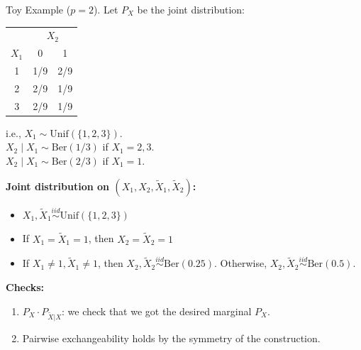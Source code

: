 \begin{example}{Toy Example ($p=2$).}
Let $P_X$ be the joint distribution:
\begin{center}
\begin{tabular}{c|cc}
    & \multicolumn{2}{c}{$X_2$} \\
    $X_1$ & 0 & 1 \\
    \hline
    1 & 1/9 & 2/9 \\
    2 & 2/9 & 1/9 \\
    3 & 2/9 & 1/9 \\
\end{tabular}
\end{center}

\noindent i.e., $X_1 \sim \text{Unif}(\{1,2,3\})$. \\
$X_2 \mid X_1 \sim \text{Ber}(1/3)$ if $X_1 = 2,3$. \\
$X_2 \mid X_1 \sim \text{Ber}(2/3)$ if $X_1 = 1$.

\noindent \textbf{Joint distribution on $(X_1, X_2, \tilde{X}_1, \tilde{X}_2)$:}
\begin{itemize}
    \item $X_1, \tilde{X}_1 \stackrel{iid}{\sim} \text{Unif}(\{1,2,3\})$
    \item If $X_1 = \tilde{X}_1 = 1$, then $X_2 = \tilde{X}_2 = 1$
    \item If $X_1 \neq 1, \tilde{X}_1 \neq 1$, then $X_2, \tilde{X}_2 \stackrel{iid}{\sim} \text{Ber}(0.25)$. Otherwise, $X_2, \tilde{X}_2 \stackrel{iid}{\sim} \text{Ber}(0.5)$.
\end{itemize}

\noindent \textbf{Checks:}
\begin{enumerate}
    \item $P_X \cdot P_{\tilde{X}|X}$: we check that we got the desired marginal $P_X$.
    \item Pairwise exchangeability holds by the symmetry of the construction.
\end{enumerate}
\end{example}


